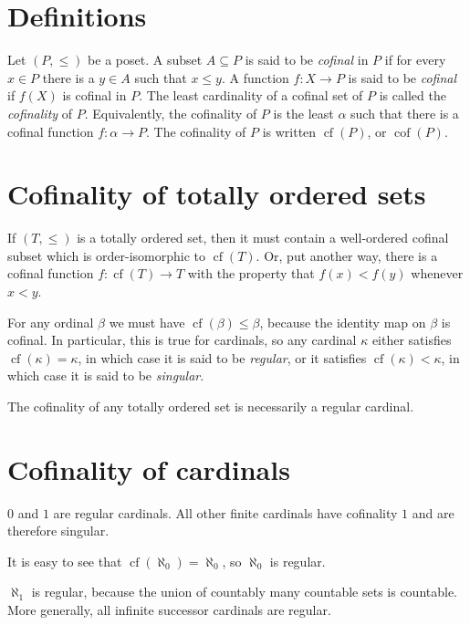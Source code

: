 \documentclass[12pt]{article}
\def\cf#1{\operatorname{cf}(#1)}
\def\cof#1{\operatorname{cof}(#1)}
\begin{document}

\section*{Definitions}

Let $(P,\leq)$ be a poset. A subset $A\subseteq P$ is said to be \emph{cofinal} in $P$ if for every $x\in P$ there is a $y\in A$ such that $x\le y$.
A function $f\colon X\to P$ is said to be \emph{cofinal} if $f(X)$ is cofinal in $P$.
The least cardinality of a cofinal set of $P$ is called the \emph{cofinality} of $P$.
Equivalently, the cofinality of $P$ is the least  $\alpha$ such that there is a cofinal function $f\colon\alpha\to P$.
The cofinality of $P$ is written $\cf{P}$, or $\cof{P}$.

\section*{Cofinality of totally ordered sets}

If $(T,\leq)$ is a totally ordered set, then it must contain a well-ordered cofinal subset which is order-isomorphic to $\cf{T}$.
Or, put another way, there is a cofinal function $f\colon\cf{T}\to T$ with the property that $f(x)<f(y)$ whenever $x<y$.

For any ordinal $\beta$ we must have $\cf{\beta}\leq\beta$, because the identity map on $\beta$ is cofinal.
In particular, this is true for cardinals, so any cardinal $\kappa$ either satisfies $\cf{\kappa}=\kappa$, in which case it is said to be \emph{regular}, or it satisfies $\cf{\kappa}<\kappa$, in which case it is said to be \emph{singular}.

The cofinality of any totally ordered set is necessarily a regular cardinal.

\section*{Cofinality of cardinals}

$0$ and $1$ are regular cardinals. All other finite cardinals have cofinality $1$ and are therefore singular.

It is easy to see that $\cf{\aleph_0}=\aleph_0$, so $\aleph_0$ is regular.

$\aleph_1$ is regular, because the union of countably many countable sets is countable.
More generally, all infinite successor cardinals are regular.
\end{document}
